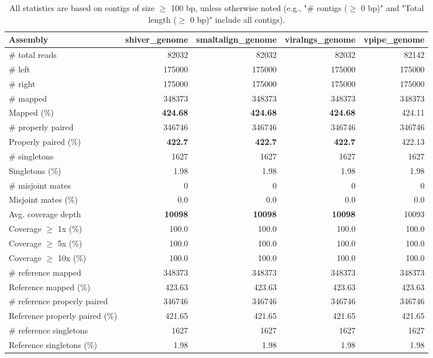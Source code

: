 \documentclass[12pt,a4paper]{article}
\begin{document}
\begin{table}[ht]
\begin{center}
\caption{All statistics are based on contigs of size $\geq$ 100 bp, unless otherwise noted (e.g., "\# contigs ($\geq$ 0 bp)" and "Total length ($\geq$ 0 bp)" include all contigs).}
\begin{tabular}{|l*{4}{|r}|}
\hline
Assembly & shiver\_genome & smaltalign\_genome & viralngs\_genome & vpipe\_genome \\ \hline
\# total reads & 82032 & 82032 & 82032 & 82142 \\ \hline
\# left & 175000 & 175000 & 175000 & 175000 \\ \hline
\# right & 175000 & 175000 & 175000 & 175000 \\ \hline
\# mapped & 348373 & 348373 & 348373 & 348373 \\ \hline
Mapped (\%) & {\bf 424.68} & {\bf 424.68} & {\bf 424.68} & 424.11 \\ \hline
\# properly paired & 346746 & 346746 & 346746 & 346746 \\ \hline
Properly paired (\%) & {\bf 422.7} & {\bf 422.7} & {\bf 422.7} & 422.13 \\ \hline
\# singletons & 1627 & 1627 & 1627 & 1627 \\ \hline
Singletons (\%) & 1.98 & 1.98 & 1.98 & 1.98 \\ \hline
\# misjoint mates & 0 & 0 & 0 & 0 \\ \hline
Misjoint mates (\%) & 0.0 & 0.0 & 0.0 & 0.0 \\ \hline
Avg. coverage depth & {\bf 10098} & {\bf 10098} & {\bf 10098} & 10093 \\ \hline
Coverage $\geq$ 1x (\%) & 100.0 & 100.0 & 100.0 & 100.0 \\ \hline
Coverage $\geq$ 5x (\%) & 100.0 & 100.0 & 100.0 & 100.0 \\ \hline
Coverage $\geq$ 10x (\%) & 100.0 & 100.0 & 100.0 & 100.0 \\ \hline
\# reference mapped & 348373 & 348373 & 348373 & 348373 \\ \hline
Reference mapped (\%) & 423.63 & 423.63 & 423.63 & 423.63 \\ \hline
\# reference properly paired & 346746 & 346746 & 346746 & 346746 \\ \hline
Reference properly paired (\%) & 421.65 & 421.65 & 421.65 & 421.65 \\ \hline
\# reference singletons & 1627 & 1627 & 1627 & 1627 \\ \hline
Reference singletons (\%) & 1.98 & 1.98 & 1.98 & 1.98 \\ \hline

\end{tabular}
\end{center}
\end{table}
\end{document}
